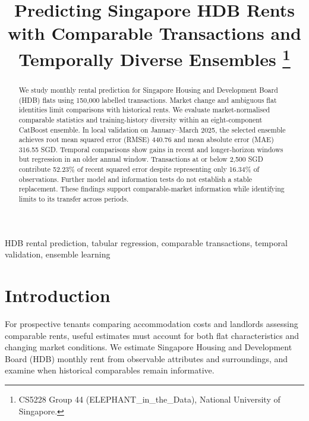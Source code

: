 \documentclass[conference]{IEEEtran}
\begin{document}

\title{Predicting Singapore HDB Rents with Comparable Transactions and Temporally Diverse Ensembles%
\thanks{CS5228 Group 44 (ELEPHANT\_in\_the\_Data), National University of Singapore.}}
\author{
\and{}
\and{}
\and{}}
\maketitle
\thispagestyle{plain}

\begin{abstract}
We study monthly rental prediction for Singapore Housing and Development Board (HDB) flats using 150,000 labelled transactions. Market change and ambiguous flat identities limit comparisons with historical rents. We evaluate market-normalised comparable statistics and training-history diversity within an eight-component CatBoost ensemble. In local validation on January--March 2025, the selected ensemble achieves root mean squared error (RMSE) 440.76 and mean absolute error (MAE) 316.55 SGD. Temporal comparisons show gains in recent and longer-horizon windows but regression in an older annual window. Transactions at or below 2,500 SGD contribute 52.23\% of recent squared error despite representing only 16.34\% of observations. Further model and information tests do not establish a stable replacement. These findings support comparable-market information while identifying limits to its transfer across periods.
\end{abstract}
\begin{IEEEkeywords}
HDB rental prediction, tabular regression, comparable transactions, temporal validation, ensemble learning
\end{IEEEkeywords}

\section{Introduction}\label{sec:introduction}
For prospective tenants comparing accommodation costs and landlords assessing comparable rents, useful estimates must account for both flat characteristics and changing market conditions. We estimate Singapore Housing and Development Board (HDB) monthly rent from observable attributes and surroundings, and examine when historical comparables remain informative.
\end{document}
